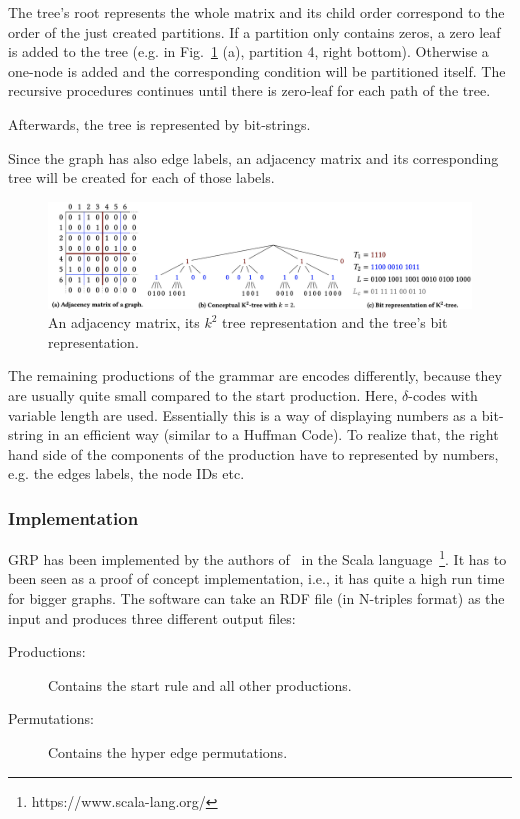 The tree's root represents the whole matrix and its child order correspond to the order of the just created partitions. If a partition only contains zeros, a zero leaf is added to the tree (e.g. in Fig.~\ref{fig:encoding} (a), partition 4, right bottom). Otherwise a one-node is added and the corresponding condition will be partitioned itself. The recursive procedures continues until there is zero-leaf for each path of the tree.

Afterwards, the tree is represented by bit-strings.

Since the graph has also edge labels, an adjacency matrix and its corresponding tree will be created for each of those labels. 

\begin{figure}
	\centering
	\includegraphics[width=1\linewidth]{figures/relatedwork/encoding}
	\caption{An adjacency matrix, its $k^2$ tree representation and the tree's bit representation.}
	\label{fig:encoding}
\end{figure}

The remaining productions of the grammar are encodes differently, because they are usually quite small compared to the start production. Here, $\delta $-codes with variable length are used. Essentially this is a way of displaying numbers as a bit-string in an efficient way (similar to a Huffman Code). To realize that, the right hand side of the components of the production have to represented by numbers, e.g. the edges labels, the node IDs etc.~\cite{maneth}


\subsubsection{Implementation}\label{sec:relatedworkGRPImpl}

GRP has been implemented by the authors of~\cite{maneth} in the Scala language~\footnote{https://www.scala-lang.org/}. It has to been seen as a proof of concept implementation, i.e., it has quite a high run time for bigger graphs. The software can take an RDF file (in N-triples format) as the input and produces three different output files:

\begin{description}
	\item [Productions:] Contains the start rule and all other productions.
	\item [Permutations:] Contains the hyper edge permutations.
\end{description} 

















